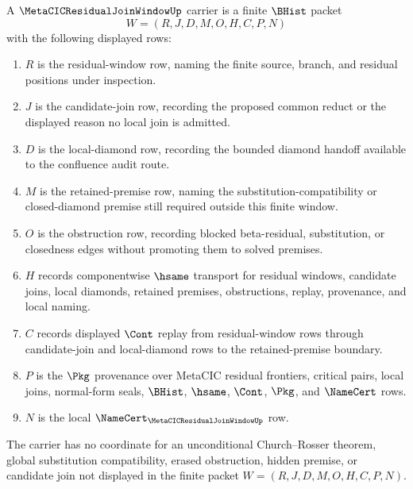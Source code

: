 \begin{definition}
\label{def:metacic-residual-join-window-carrier}
A $\MetaCICResidualJoinWindowUp$ carrier is a finite $\BHist$ packet
$$
W=(R,J,D,M,O,H,C,P,N)
$$
with the following displayed rows:
\begin{enumerate}
\item $R$ is the residual-window row, naming the finite source, branch, and residual positions under inspection.
\item $J$ is the candidate-join row, recording the proposed common reduct or the displayed reason no local join is admitted.
\item $D$ is the local-diamond row, recording the bounded diamond handoff available to the confluence audit route.
\item $M$ is the retained-premise row, naming the substitution-compatibility or closed-diamond premise still required outside this finite window.
\item $O$ is the obstruction row, recording blocked beta-residual, substitution, or closedness edges without promoting them to solved premises.
\item $H$ records componentwise $\hsame$ transport for residual windows, candidate joins, local diamonds, retained premises, obstructions, replay, provenance, and local naming.
\item $C$ records displayed $\Cont$ replay from residual-window rows through candidate-join and local-diamond rows to the retained-premise boundary.
\item $P$ is the $\Pkg$ provenance over MetaCIC residual frontiers, critical pairs, local joins, normal-form seals, $\BHist$, $\hsame$, $\Cont$, $\Pkg$, and $\NameCert$ rows.
\item $N$ is the local $\NameCert_{\MetaCICResidualJoinWindowUp}$ row.
\end{enumerate}
The carrier has no coordinate for an unconditional Church--Rosser theorem, global substitution compatibility, erased obstruction, hidden premise, or candidate join not displayed in the finite packet $W=(R,J,D,M,O,H,C,P,N)$.
\end{definition}

